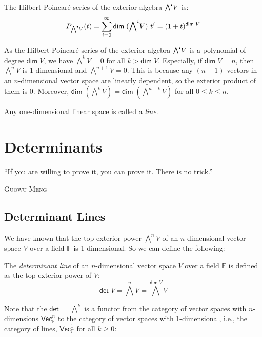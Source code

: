 \documentclass[
	11pt, %
	fleqn, %
	a4paper, %
]{LegrandOrangeBook}
\newcommand{\smallbullet}{\scalebox{0.5}{$\bullet$}}
\newcommand{\F}{\mathbb{F}} %
\newcommand{\Vect}{\boldsymbol{\mathsf{Vec}}} %
\newcommand{\Ext}{{\bigwedge}^{\smallbullet}} %
\renewcommand{\dim}{\mathsf{dim\;}} %
\renewcommand{\det}{\mathsf{det\;}} %
\let\originalepigraph\epigraph
\renewcommand\epigraph[2]{\originalepigraph{#1}{\textsc{#2}}}
\begin{document}
\begin{example}
    The Hilbert-Poincaré series of the exterior algebra $\Ext V$ is:
    \[
        P_{\Ext V}(t) = \sum_{i = 0}^{\infty} \dim({\bigwedge}^i V)\ t^i = (1 + t)^{\dim{V}}
    \]
\end{example}

As the Hilbert-Poincaré series of the exterior algebra $\Ext V$ is a polynomial of degree $\dim{V}$, we have ${\bigwedge}^k V = 0$ for all $k > \dim{V}$. Especially, if $\dim{V} = n$, then ${\bigwedge}^n V$ is 1-dimensional and ${\bigwedge}^{n + 1} V = 0$. This is because any $(n + 1)$ vectors in an $n$-dimensional vector space are linearly dependent, so the exterior product of them is $0$. Moreover, $\dim({\bigwedge}^k V) = \dim({\bigwedge}^{n - k} V)$ for all $0 \leq k \leq n$.

Any one-dimensional linear space is called a \emph{line}.
\chapter{Determinants}

\epigraph{``If you are willing to prove it, you can prove it. There is no trick.''}{Guowu Meng}

\section{Determinant Lines}

We have known that the top exterior power ${\bigwedge}^n V$ of an $n$-dimensional vector space $V$ over a field $\F$ is 1-dimensional. So we can define the following:

\begin{definition}
    The \emph{determinant line} of an $n$-dimensional vector space $V$ over a field $\F$ is defined as the top exterior power of $V$:
    \[
        \det{V} = {\bigwedge}^n V = {\bigwedge}^{\dim{V}} V
    \]
\end{definition}

Note that the $\det = {\bigwedge}^k$ is a functor from the category of vector spaces with $n$-dimensions $\Vect_{\F}^n$ to the category of vector spaces with 1-dimensional, i.e., the category of lines, $\Vect_{\F}^1$ for all $k \geq 0$:
\begin{center}
\end{center}
\end{document}
